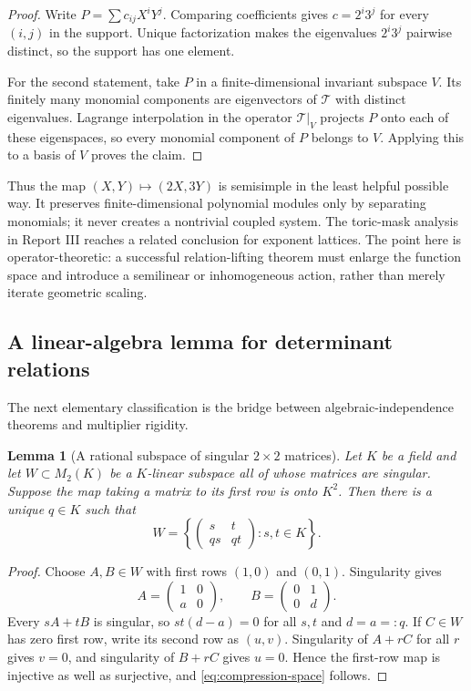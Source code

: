\documentclass[11pt,oneside]{article}
\newtheorem{lemma}[theorem]{Lemma}
\theoremstyle{definition}
\theoremstyle{remark}
\newcommand{\cT}{\mathcal T}
\begin{document}
\begin{proof}
Write $P=\sum c_{ij}X^iY^j$.  Comparing coefficients gives
$c=2^i3^j$ for every $(i,j)$ in the support.  Unique factorization makes the eigenvalues
$2^i3^j$ pairwise distinct, so the support has one element.

For the second statement, take $P$ in a finite-dimensional invariant subspace $V$.  Its finitely
many monomial components are eigenvectors of $\cT$ with distinct eigenvalues.  Lagrange
interpolation in the operator $\cT|_V$ projects $P$ onto each of these eigenspaces, so every
monomial component of $P$ belongs to $V$.  Applying this to a basis of $V$ proves the claim.
\end{proof}

Thus the map $(X,Y)\mapsto(2X,3Y)$ is semisimple in the least helpful possible way.  It preserves
finite-dimensional polynomial modules only by separating monomials; it never creates a nontrivial
coupled system.  The toric-mask analysis in Report III reaches a related conclusion for exponent
lattices.  The point here is operator-theoretic: a successful relation-lifting theorem must enlarge
the function space and introduce a semilinear or inhomogeneous action, rather than merely iterate
geometric scaling.

\subsection{A linear-algebra lemma for determinant relations}

The next elementary classification is the bridge between algebraic-independence theorems and
multiplier rigidity.

\begin{lemma}[A rational subspace of singular $2\times2$ matrices]
\label{lem:singular-subspace}
Let $K$ be a field and let $W\subset M_2(K)$ be a $K$-linear subspace all of whose matrices are
singular.  Suppose the map taking a matrix to its first row is onto $K^2$.  Then there is a unique
$q\in K$ such that
\begin{equation}
  W=\left\{
  \begin{pmatrix}s&t\\qs&qt\end{pmatrix}:s,t\in K
  \right\}.
  \label{eq:compression-space}
\end{equation}
\end{lemma}

\begin{proof}
Choose $A,B\in W$ with first rows $(1,0)$ and $(0,1)$.  Singularity gives
\[
 A=\begin{pmatrix}1&0\\a&0\end{pmatrix},
 \qquad
 B=\begin{pmatrix}0&1\\0&d\end{pmatrix}.
\]
Every $sA+tB$ is singular, so $st(d-a)=0$ for all $s,t$ and $d=a=:q$.
If $C\in W$ has zero first row, write its second row as $(u,v)$.  Singularity of $A+rC$ for all
$r$ gives $v=0$, and singularity of $B+rC$ gives $u=0$.  Hence the first-row map is injective as
well as surjective, and \eqref{eq:compression-space} follows.
\end{proof}
\end{document}
